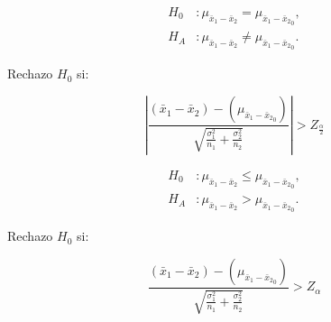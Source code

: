 
\begin{minipage}[c]{\textwidth}
    \begin{minipage}[c]{0.3 \textwidth}\item
    	\begin{align*}
    	H_0&: \mu _{ \bar { x } _{ 1 }-\bar { x } _{ 2 }} = \mu _{ \bar { x } _{ 1 }-\bar { x } _{ 2 }}_0,\\
    	H_A&: \mu _{ \bar { x } _{ 1 }-\bar { x } _{ 2 }} \neq \mu _{ \bar { x } _{ 1 }-\bar { x } _{ 2 }}_0.    	
    	\end{align*}\end{minipage} \hfill
    \begin{minipage}[b]{0.3 \textwidth}\item
				Rechazo	$H_0$ si:		
		\end{minipage} \hfill
    \begin{minipage}[c]{0.3 \textwidth}\item
	 $$\left|\frac {( \bar{x}_1-\bar{x}_2)-(\mu _{ \bar { x } _{ 1 }-\bar { x } _{ 2 }}_0 )}{\sqrt{\frac { \sigma^ 2_1 }{n_1} +\frac { \sigma^ 2_2 }{n_2}}  }\right|> Z_{\frac{\alpha}{2}}$$
    \end{minipage}
    \end{minipage}
    
    
	\begin{minipage}[c]{\textwidth}
    \begin{minipage}[c]{0.3 \textwidth}\item
    	\begin{align*}
    	H_0&: \mu _{ \bar { x } _{ 1 }-\bar { x } _{ 2 }} \le \mu _{ \bar { x } _{ 1 }-\bar { x } _{ 2 }}_0,\\
    	H_A&: \mu _{ \bar { x } _{ 1 }-\bar { x } _{ 2 }} > \mu _{ \bar { x } _{ 1 }-\bar { x } _{ 2 }}_0.    	
    	\end{align*}\end{minipage} \hfill
    \begin{minipage}[b]{0.3 \textwidth}\item
				Rechazo $H_0$ si:		
		\end{minipage} \hfill
    \begin{minipage}[c]{0.3 \textwidth}\item
	 $$\frac {( \bar{x}_1-\bar{x}_2)-(\mu _{ \bar { x } _{ 1 }-\bar { x } _{ 2 }}_0 )}{\sqrt{\frac { \sigma^ 2_1 }{n_1} +\frac { \sigma^ 2_2 }{n_2}}  }> Z_{\alpha}$$
    \end{minipage}
    \end{minipage}
    
